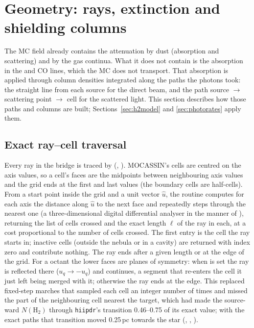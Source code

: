 \section{Geometry: rays, extinction and shielding columns}
\label{sec:geometry}

The MC field already contains the attenuation by dust (absorption and
scattering) and by the gas continua. What it does not contain is the
absorption in the \Htwo{} and CO lines, which the MC does not transport. That
absorption is applied through column densities integrated along the paths the
photons took: the straight line from each source for the direct beam, and the
path source $\to$ scattering point $\to$ cell for the scattered light. This
section describes how those paths and columns are built;
Sections~\ref{sec:h2model} and \ref{sec:photorates} apply them.

\subsection{Exact ray--cell traversal}
\label{sec:raycells}

Every ray in the bridge is traced by 
(, ). MOCASSIN's cells are centred on
the axis values, so a cell's faces are the midpoints between neighbouring axis
values and the grid ends at the first and last values (the boundary cells are
half-cells). From a start point inside the grid and a unit vector $\hat u$,
the routine computes for each axis the distance along $\hat u$ to the next
face and repeatedly steps through the nearest one (a three-dimensional digital
differential analyser in the manner of \citealt{AmanatidesWoo1987}), returning
the list of cells crossed and the exact length $\ell$ of the ray in each, at a
cost proportional to the number of cells crossed. The first entry is the cell
the ray starts in; inactive cells (outside the nebula or in a cavity) are
returned with index zero and contribute nothing. The ray ends after a given
length or at the edge of the grid. For a  octant the lower
faces are planes of symmetry: when  is set the ray is reflected
there ($u_q\to-u_q$) and continues, a segment that re-enters the cell it just
left being merged with it; otherwise the ray ends at the edge. This replaced
fixed-step marches that sampled each cell an integer number of times and
missed the part of the neighbouring cell nearest the target, which had made
the source-ward $N(\mathrm{H_2})$ through \texttt{hiipdr}'s transition 0.46--0.75
of its exact value; with the exact paths that transition moved 0.25\,pc
towards the star (, , ).

